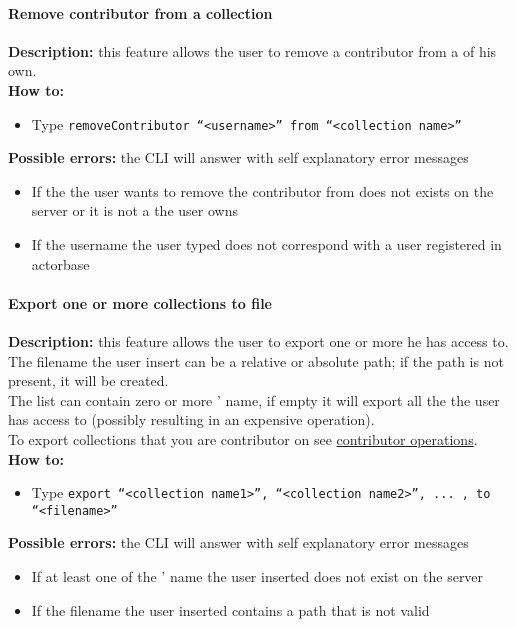 \documentclass{scalatekids-article}
\begin{document}
\paragraph{Remove contributor from a collection}
\label{sec:removecontributor}
\textbf{Description:} this feature allows the user to remove a contributor from a  of his own.\\
\textbf{How to:}
\begin{itemize}
\item Type \texttt{removeContributor ``<username>'' from ``<collection name>''}
\end{itemize}
\textbf{Possible errors:} the CLI will answer with self explanatory error messages
\begin{itemize}
\item If the  the user wants to remove the contributor from does not exists on the server or it is not a  the user owns
\item If the username the user typed does not correspond with a user registered in actorbase
\end{itemize}

\paragraph{Export one or more collections to file}
\label{sec:export}
\textbf{Description:} this feature allows the user to export one or more  he has access to.\\
The filename the user insert can be a relative or absolute path; if the path is not present, it will be created.\\
The  list can contain zero or more ' name, if empty it will export 
all the  the user has access to (possibly resulting in an expensive operation).\\
To export collections that you are contributor on see \hyperref[sec:contributoroperations]{contributor operations}.\\
\textbf{How to:}
\begin{itemize}
\item Type \texttt{export ``<collection name1>'', ``<collection name2>'', ... , to ``<filename>''}
\end{itemize}
\textbf{Possible errors:} the CLI will answer with self explanatory error messages
\begin{itemize}
\item If at least one of the ' name the user inserted does not exist on the server
\item If the filename the user inserted contains a path that is not valid
\end{itemize}
\end{document}
